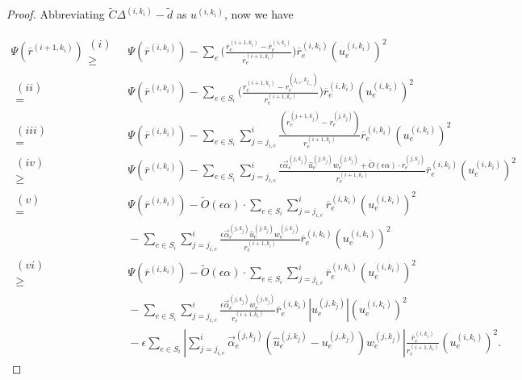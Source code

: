 \documentclass[11pt]{article}
\newcommand\dd{\boldsymbol{\mathit{d}}}
\newcommand\rr{\boldsymbol{\mathit{r}}}
\newcommand\uu{\boldsymbol{\mathit{u}}}
\newcommand\ww{\boldsymbol{\mathit{w}}}
\newcommand\rrbar{\overline{\boldsymbol{\mathit{r}}}}
\newcommand\CC{\boldsymbol{\mathit{C}}}
\newcommand{\wh}{\widehat}
\newcommand{\wt}{\widetilde}
\newcommand{\ov}{\overline}
\begin{document}
\begin{proof}
Abbreviating $\wt{\CC}\Delta^{(i,k_i)}-\wt{\dd}$ as $\uu^{(i,k_i)}$, now we have

\begin{align*}
\Psi(\ov{\rr}^{(i+1,k_i)}) 
\substack{(i)\\ \geq} &~ \Psi(\ov{\rr}^{(i,k_i)}) - \sum_e \Big(\frac{\rrbar_e^{(i+1,k_i)}-\ov{\rr}^{(i,k_i)}_e}{\ov{\rr}_e^{(i+1,k_i)}} \Big) \ov{\rr}^{(i,k_i)}_e (\uu^{(i,k_i)}_e)^2\\
\substack{(ii)\\ =}&~ \Psi(\ov{\rr}^{(i,k_i)}) - \sum_{e \in S_i} \Big(\frac{\rr_e^{(i+1,k_i)} - \rr_e^{(j_{i,e},k_{j_{i,e}})}}{\rr_e^{(i+1,k_i)}} \Big) \ov{\rr}^{(i,k_i)}_e (\uu^{(i,k_i)}_e)^2 \\
\substack{(iii)\\ =} &~ \Psi(\ov{\rr}^{(i,k_i)}) - \sum_{e \in S_i} \sum_{j=j_{i,e}}^{i} \frac{ (\rr_e^{(j+1,k_j)} - \rr_e^{(j,k_j)}) }{\rr_e^{(i+1,k_i)}} \ov{\rr}^{(i,k_i)}_e (\uu^{(i,k_i)}_e)^2 \\
\substack{(iv)\\ \geq} &~ \Psi(\ov{\rr}^{(i,k_i)}) - \sum_{e \in S_i} \sum_{j=j_{i,e}}^{i} \frac{ \epsilon \overrightarrow{\alpha}_e^{(j,k_j)}  \wh{\uu}^{(j,k_j)}_e \ww^{(j,k_j)}_e + \wt{O}(\epsilon\alpha) \cdot \rr_e^{(j,k_j)}}{\rr_e^{(i+1,k_i)}} \ov{\rr}^{(i,k_i)}_e (\uu^{(i,k_i)}_e)^2 \\
\substack{(v)\\ =} &~ \Psi(\ov{\rr}^{(i,k_i)}) - \wt{O}(\epsilon \alpha) \cdot \sum_{e \in S_i} \sum_{j=j_{i,e}}^{i} \ov{\rr}^{(i,k_i)}_e (\uu^{(i,k_i)}_e)^2  \\
&~ - \sum_{e \in S_i} \sum_{j=j_{i,e}}^{i} \frac{ \epsilon \overrightarrow{\alpha}_e^{(j,k_j)}  \wh{\uu}^{(j,k_j)}_e \ww^{(j,k_j)}_e}{\rr_e^{(i+1,k_i)}} \ov{\rr}^{(i,k_i)}_e (\uu^{(i,k_i)}_e)^2\\
\substack{(vi)\\ \geq} &~ \Psi(\ov{\rr}^{(i,k_i)}) - \wt{O}(\epsilon \alpha) \cdot \sum_{e \in S_i} \sum_{j=j_{i,e}}^{i} \ov{\rr}^{(i,k_i)}_e (\uu^{(i,k_i)}_e)^2 \\
&~ - \sum_{e \in S_i} \sum_{j=j_{i,e}}^{i} \frac{ \epsilon \overrightarrow{\alpha}_e^{(j,k_j)} \ww^{(j,k_j)}_e}{\rr_e^{(i+1,k_i)}} \ov{\rr}^{(i,k_i)}_e |\uu^{(j,k_j)}_e|(\uu^{(i,k_i)}_e)^2 \\
&~ - \epsilon \sum_{e \in S_i}  |\sum_{j=j_{i,e}}^{i} \overrightarrow{\alpha}_e^{(j,k_j)}  (\wh{\uu}^{(j,k_j)}_e - \uu^{(j,k_j)}_e) \ww^{(j,k_j)}_e| \frac{\ov{\rr}^{(i,k_i)}_e}{\rr_e^{(i+1,k_i)}} (\uu^{(i,k_i)}_e)^2.
\end{align*}


\end{proof}
\end{document}
